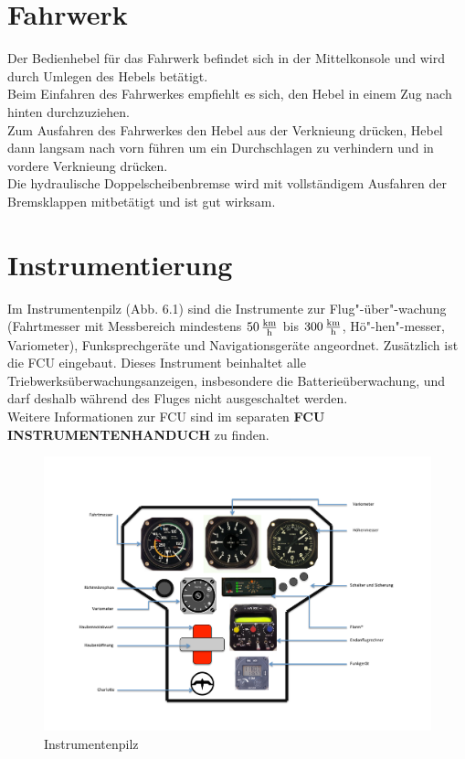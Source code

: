 \section{Fahrwerk}
Der Bedienhebel für das Fahrwerk befindet sich in der Mittelkonsole und wird durch Umlegen des Hebels betätigt.\\
Beim Einfahren des Fahrwerkes empfiehlt es sich, den Hebel in einem Zug nach hinten durchzuziehen.\\
Zum Ausfahren des Fahrwerkes den Hebel aus der Verknieung drücken, Hebel dann langsam nach vorn führen um ein Durchschlagen zu verhindern und in vordere Verknieung drücken.\\
Die hydraulische Doppelscheibenbremse wird mit vollständigem Ausfahren der Bremsklappen mitbetätigt und ist gut wirksam.


\section{Instrumentierung}
Im Instrumentenpilz (Abb. 6.1) sind die Instrumente zur Flug"-über"-wachung (Fahrtmesser mit Messbereich mindestens $\unit[50] {\frac{km}{h}}$ bis $\unit[300]{\frac{km}{h}}$, Hö"-hen"-messer, Variometer), Funksprechgeräte und Navigationsgeräte angeordnet.
Zusätzlich ist die FCU eingebaut. Dieses Instrument beinhaltet alle Triebwerksüberwachungsanzeigen, insbesondere die Batterieüberwachung, und darf deshalb während des Fluges nicht ausgeschaltet werden.\\

Weitere Informationen zur FCU sind im separaten \textbf{FCU INSTRUMENTENHANDUCH} zu finden.\\

\begin{figure}[ht]
\includegraphics[angle=90,width=\textwidth]{bilder/instrumentenpilz.pdf}
\caption{Instrumentenpilz}
\end{figure}

